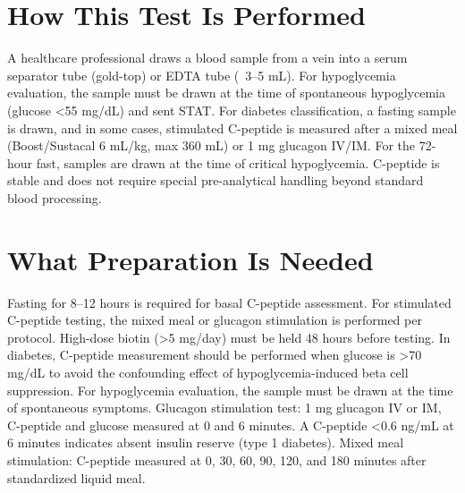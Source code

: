 \section*{How This Test Is Performed}
A healthcare professional draws a blood sample from a vein into a serum separator tube (gold-top) or EDTA tube (~3--5 mL). For hypoglycemia evaluation, the sample must be drawn at the time of spontaneous hypoglycemia (glucose <55 mg/dL) and sent STAT. For diabetes classification, a fasting sample is drawn, and in some cases, stimulated C-peptide is measured after a mixed meal (Boost/Sustacal 6 mL/kg, max 360 mL) or 1 mg glucagon IV/IM. For the 72-hour fast, samples are drawn at the time of critical hypoglycemia. C-peptide is stable and does not require special pre-analytical handling beyond standard blood processing.

\section*{What Preparation Is Needed}
Fasting for 8--12 hours is required for basal C-peptide assessment. For stimulated C-peptide testing, the mixed meal or glucagon stimulation is performed per protocol. High-dose biotin (>5 mg/day) must be held 48 hours before testing. In diabetes, C-peptide measurement should be performed when glucose is >70 mg/dL to avoid the confounding effect of hypoglycemia-induced beta cell suppression. For hypoglycemia evaluation, the sample must be drawn at the time of spontaneous symptoms. Glucagon stimulation test: 1 mg glucagon IV or IM, C-peptide and glucose measured at 0 and 6 minutes. A C-peptide <0.6 ng/mL at 6 minutes indicates absent insulin reserve (type 1 diabetes). Mixed meal stimulation: C-peptide measured at 0, 30, 60, 90, 120, and 180 minutes after standardized liquid meal.


